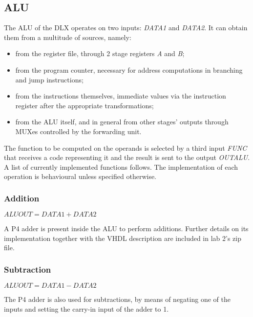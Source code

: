 \subsection{ALU}
The ALU of the DLX operates on two inputs: \emph{DATA1} and \emph{DATA2}. It can obtain them from a multitude of sources, namely: 
\begin{itemize}
	\item from the register file, through 2 stage registers \emph{A} and \emph{B};
	\item from the program counter, necessary for address computations in branching and jump instructions;
	\item from the instructions themselves, immediate values via the instruction register after the appropriate transformations;
	\item from the ALU itself, and in general from other stages' outputs through MUXes controlled by the forwarding unit.
\end{itemize}


The function to be computed on the operands is selected by a third input \emph{FUNC} that receives a code representing it and the result is sent to the output \emph{OUTALU}. A list of currently implemented functions follows. The implementation of each operation is behavioural unless specified otherwise. 

\subsubsection{Addition}
$ \mathit{ALUOUT} = \mathit{DATA1} + \mathit{DATA2} $

A P4 adder is present inside the ALU to perform additions. Further details on its implementation together with the VHDL description are included in lab 2's zip file.

\subsubsection{Subtraction}
$ \mathit{ALUOUT} = \mathit{DATA1} - \mathit{DATA2} $


The P4 adder is also used for subtractions, by means of negating one of  the inputs and setting the carry-in input of the adder to 1.


